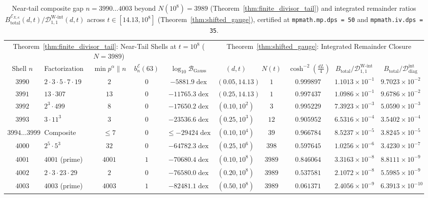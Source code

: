 \documentclass[11pt,reqno]{amsart}
\theoremstyle{definition}
\theoremstyle{remark}
\numberwithin{equation}{section}
\begin{document}
\begin{table}[t]
\centering
\caption{Near-tail composite gap $n = 3990 \dots 4003$ beyond $N(10^8) = 3989$ (Theorem~\ref{thm:finite_divisor_tail}) and integrated remainder ratios $B_{\mathrm{total}}^{\mathcal{E}_{X,\kappa}}(d,t)/\mathcal{D}_{1,1}^{\mathrm{W\text{-}int}}(d,t)$ across $t \in [14.13, 10^8]$ (Theorem~\ref{thm:shifted_gauge}), certified at \texttt{mpmath.mp.dps = 50} and \texttt{mpmath.iv.dps = 35}.}\label{tab:tail_and_shifted_gauge}
\scriptsize
\setlength{\tabcolsep}{2.0pt}
\begin{tabular}{@{}clccc|ccccc@{}}
\toprule
\multicolumn{5}{c|}{Theorem~\ref{thm:finite_divisor_tail}: Near-Tail Shells at $t = 10^8$ ($N = 3989$)} & \multicolumn{5}{c}{Theorem~\ref{thm:shifted_gauge}: Integrated Remainder Closure} \\
\cmidrule(r){1-5}\cmidrule(l){6-10}
Shell $n$ & Factorization & $\min p^\alpha \parallel n$ & $b_n^{\mathcal{E}}(63)$ & $\log_{10}\mathcal{B}_{\mathrm{Gauss}}$ & $(d, t)$ & $N(t)$ & $\cosh^{-2}(\frac{dL}{4})$ & $B_{\mathrm{total}}/\mathcal{D}_{1,1}^{\mathrm{W\text{-}int}}$ & $B_{\mathrm{total}}/\mathcal{D}_{\mathrm{diag}}^{\mathrm{int}}$ \\
\midrule
$3990$ & $2\cdot 3\cdot 5\cdot 7\cdot 19$ & $2$  & $0$ & $-5881.9\;\mathrm{dex}$  & $(0.05, 14.13)$ & $1$    & $0.999897$ & $1.1013 \times 10^{-1}$ & $9.7023 \times 10^{-2}$ \\
$3991$ & $13\cdot 307$                    & $13$ & $0$ & $-11765.3\;\mathrm{dex}$ & $(0.25, 14.13)$ & $1$    & $0.997437$ & $1.0986 \times 10^{-1}$ & $9.6786 \times 10^{-2}$ \\
$3992$ & $2^3\cdot 499$                   & $8$  & $0$ & $-17650.2\;\mathrm{dex}$ & $(0.10, 10^2)$  & $3$    & $0.995229$ & $7.3923 \times 10^{-3}$ & $5.0590 \times 10^{-3}$ \\
$3993$ & $3\cdot 11^3$                    & $3$  & $0$ & $-23536.6\;\mathrm{dex}$ & $(0.25, 10^3)$  & $12$   & $0.905952$ & $6.5316 \times 10^{-4}$ & $3.5402 \times 10^{-4}$ \\
$3994 \dots 3999$ & Composite             & $\le 7$ & $0$ & $\le -29424\;\mathrm{dex}$ & $(0.10, 10^4)$  & $39$   & $0.966784$ & $8.5237 \times 10^{-5}$ & $3.8245 \times 10^{-5}$ \\
$4000$ & $2^5\cdot 5^3$                   & $32$ & $0$ & $-64782.3\;\mathrm{dex}$ & $(0.25, 10^6)$  & $398$  & $0.597645$ & $1.0256 \times 10^{-6}$ & $3.4230 \times 10^{-7}$ \\
$4001$ & $4001$ (prime)                   & $4001$ & $1$ & $-70680.4\;\mathrm{dex}$ & $(0.10, 10^8)$  & $3989$ & $0.846064$ & $3.3163 \times 10^{-8}$ & $8.8111 \times 10^{-9}$ \\
$4002$ & $2\cdot 3\cdot 23\cdot 29$       & $2$  & $0$ & $-76580.0\;\mathrm{dex}$ & $(0.20, 10^8)$  & $3989$ & $0.537581$ & $2.1072 \times 10^{-8}$ & $5.5985 \times 10^{-9}$ \\
$4003$ & $4003$ (prime)                   & $4003$ & $1$ & $-82481.1\;\mathrm{dex}$ & $(0.50, 10^8)$  & $3989$ & $0.061371$ & $2.4056 \times 10^{-9}$ & $6.3913 \times 10^{-10}$ \\
\bottomrule
\end{tabular}
\end{table}
\end{document}
